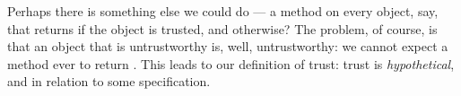 Perhaps there is something else we could do --- a  method
on every object, say, that returns  if the object is
trusted, and  otherwise?
  The problem, of course, is that
an object that is untrustworthy is, well, untrustworthy: we cannot
expect a  method ever to return .  This leads
to our definition of trust: trust is {\em hypothetical}, and in
relation to some specification.






